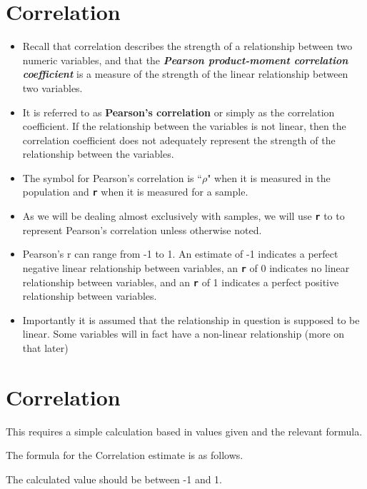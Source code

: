 \documentclass[]{report}
\begin{document}
\section*{Correlation}
\begin{itemize}
	\item Recall that correlation describes the strength of a relationship between two numeric variables, and that the \textbf{\textit{Pearson product-moment correlation coefficient}} is a measure of the strength of the linear relationship between two variables.
	
	\item It is referred to as \textbf{Pearson's correlation} or simply as the correlation coefficient. If the relationship between the variables is not linear, then the correlation coefficient does not adequately represent the strength of the relationship between the variables.
	
	\item The symbol for Pearson's correlation is ``$\rho$" when it is measured in the population and \texttt{\textbf{r}} when it is measured for a sample.
	
	\item As we will be dealing almost exclusively with samples, we will use \texttt{\textbf{r}} to to represent Pearson's correlation unless otherwise noted.
	
	\item Pearson's r can range from -1 to 1. An estimate of -1 indicates a perfect negative linear relationship between variables, an \texttt{\textbf{r}} of 0 indicates no linear relationship between variables, and an \texttt{\textbf{r}} of 1 indicates a perfect positive relationship between variables.
	
	\item Importantly it is assumed that the relationship in question is supposed to be linear. Some variables will in fact have a non-linear relationship (more on that later)
\end{itemize}

\section{Correlation}

This requires a simple calculation based in values given and the relevant formula.

The formula for the Correlation estimate is as follows.

The calculated value should be between -1 and 1.
\end{document}
